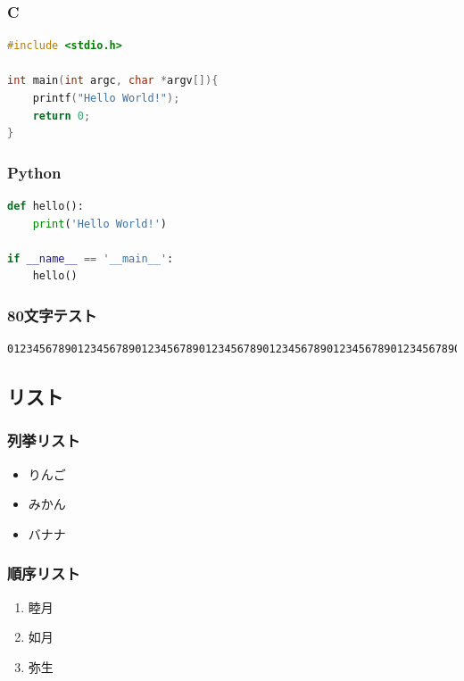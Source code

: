 \subsubsection{C}
\begin{lstlisting}[language=C]
#include <stdio.h>

int main(int argc, char *argv[]){
    printf("Hello World!");
    return 0;
}
\end{lstlisting}

\subsubsection{Python}
\begin{lstlisting}[language=python]
def hello():
    print('Hello World!')

if __name__ == '__main__':
    hello()
\end{lstlisting}

\subsubsection{80文字テスト}
\begin{lstlisting}
01234567890123456789012345678901234567890123456789012345678901234567890123456789
\end{lstlisting}

\subsection{リスト}

\subsubsection{列挙リスト}
\begin{itemize}
\item りんご
\item みかん
\item バナナ
\end{itemize}

\subsubsection{順序リスト}
\begin{enumerate}
\item 睦月
\item 如月
\item 弥生
\end{enumerate}

